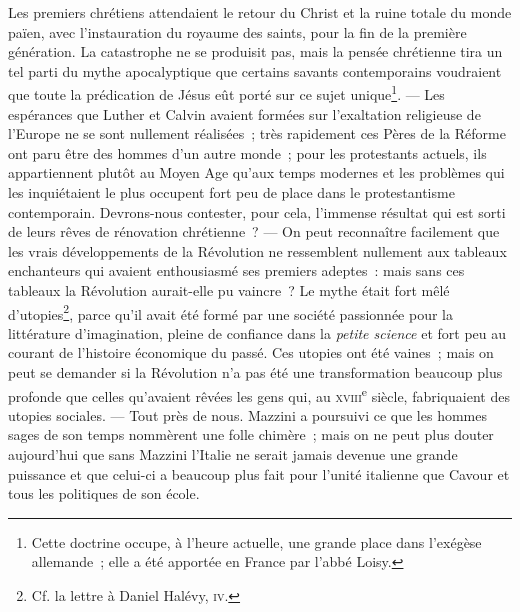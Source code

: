 \documentclass[french,twoside]{book} %
\begin{document}
Les premiers chrétiens attendaient le retour du Christ et la ruine totale du monde païen, avec l’instauration du royaume des saints, pour la fin de la première génération. La catastrophe ne se produisit pas, mais la pensée chrétienne tira un tel parti du mythe apocalyptique que certains savants contemporains voudraient que toute la prédication de Jésus eût porté sur ce sujet unique\footnote{ \noindent Cette doctrine occupe, à l’heure actuelle, une grande place dans l’exégèse allemande ; elle a été apportée en France par l’abbé Loisy.
 }. — Les espérances que Luther et Calvin avaient formées sur l’exaltation religieuse de l’Europe ne se sont nullement réalisées ; très rapidement ces Pères de la Réforme ont paru être des hommes d’un autre monde ; pour les protestants actuels, ils appartiennent plutôt au Moyen Age qu’aux temps modernes et les problèmes qui les inquiétaient le plus occupent fort peu de place dans le protestantisme contemporain. Devrons-nous contester, pour cela, l’immense résultat qui est sorti de leurs rêves de rénovation chrétienne ? — On peut reconnaître facilement  que les vrais développements de la Révolution ne ressemblent nullement aux tableaux enchanteurs qui avaient enthousiasmé ses premiers adeptes : mais sans ces tableaux la Révolution aurait-elle pu vaincre ? Le mythe était fort mêlé d’utopies\footnote{ \noindent Cf. la lettre à Daniel Halévy, {\scshape iv}.
 }, parce qu’il avait été formé par une société passionnée pour la littérature d’imagination, pleine de confiance dans la \emph{petite science} et fort peu au courant de l’histoire économique du passé. Ces utopies ont été vaines ; mais on peut se demander si la Révolution n’a pas été une transformation beaucoup plus profonde que celles qu’avaient rêvées les gens qui, au {\scshape xviii}\textsuperscript{e} siècle, fabriquaient des utopies sociales. — Tout près de nous. Mazzini a poursuivi ce que les hommes sages de son temps nommèrent une folle chimère ; mais on ne peut plus douter aujourd’hui que sans Mazzini l’Italie ne serait jamais devenue une grande puissance et que celui-ci a beaucoup plus fait pour l’unité italienne que Cavour et tous les politiques de son école.\par
\end{document}
